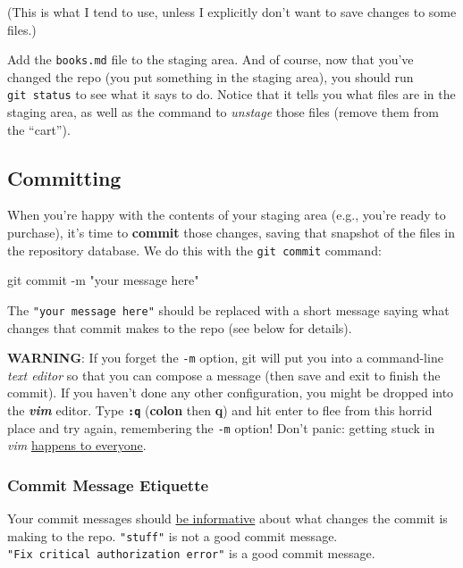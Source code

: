 \documentclass[]{book}
\newenvironment{Shaded}{\begin{snugshade}}{\end{snugshade}}
\newcommand{\StringTok}[1]{\textcolor[rgb]{0.31,0.60,0.02}{#1}}
\newcommand{\FunctionTok}[1]{\textcolor[rgb]{0.00,0.00,0.00}{#1}}
\newcommand{\NormalTok}[1]{#1}
\theoremstyle{definition}
\theoremstyle{definition}
\theoremstyle{remark}
\begin{document}
(This is what I tend to use, unless I explicitly don't want to save
changes to some files.)

Add the \texttt{books.md} file to the staging area. And of course, now
that you've changed the repo (you put something in the staging area),
you should run \texttt{git\ status} to see what it says to do. Notice
that it tells you what files are in the staging area, as well as the
command to \emph{unstage} those files (remove them from the ``cart'').

\subsection{Committing}\label{committing}

When you're happy with the contents of your staging area (e.g., you're
ready to purchase), it's time to \textbf{commit} those changes, saving
that snapshot of the files in the repository database. We do this with
the \texttt{git\ commit} command:

\begin{Shaded}
\begin{Highlighting}[]
\FunctionTok{git}\NormalTok{ commit -m }\StringTok{"your message here"}
\end{Highlighting}
\end{Shaded}

The \texttt{"your\ message\ here"} should be replaced with a short
message saying what changes that commit makes to the repo (see below for
details).

\textbf{WARNING}: If you forget the \texttt{-m} option, git will put you
into a command-line \emph{text editor} so that you can compose a message
(then save and exit to finish the commit). If you haven't done any other
configuration, you might be dropped into the \textbf{\emph{vim}} editor.
Type \textbf{\texttt{:q}} (\textbf{colon} then \textbf{q}) and hit enter
to flee from this horrid place and try again, remembering the
\texttt{-m} option! Don't panic: getting stuck in \emph{vim}
\href{https://stackoverflow.blog/2017/05/23/stack-overflow-helping-one-million-developers-exit-vim/}{happens
to everyone}.

\subsubsection{Commit Message Etiquette}\label{commit-message-etiquette}

Your commit messages should \href{https://xkcd.com/1296/}{be
informative} about what changes the commit is making to the repo.
\texttt{"stuff"} is not a good commit message.
\texttt{"Fix\ critical\ authorization\ error"} is a good commit message.
\end{document}
